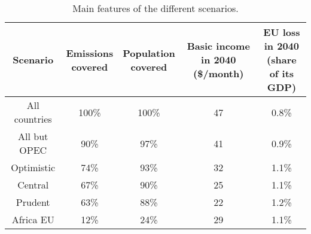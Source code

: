 \begin{table}[h]

\caption{\label{tab:scenarios_table.tex}Main features of the different scenarios.}
\centering
\begin{tabular}[t]{ccccc}
\toprule
Scenario & \makecell{Emissions\\covered} & \makecell{Population\\covered} & \makecell{Basic income\\in 2040 (\$/month)} & \makecell{EU loss in 2040\\(share of its GDP)}\\
\midrule
All countries & 100\% & 100\% & 47 & 0.8\%\\
All but OPEC & 90\% & 97\% & 41 & 0.9\%\\
Optimistic & 74\% & 93\% & 32 & 1.1\%\\
Central & 67\% & 90\% & 25 & 1.1\%\\
Prudent & 63\% & 88\% & 22 & 1.2\%\\
Africa EU & 12\% & 24\% & 29 & 1.1\%\\
\bottomrule
\end{tabular}
\end{table}